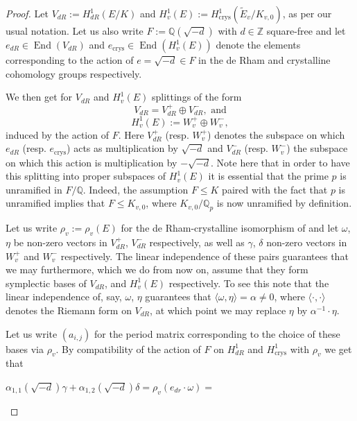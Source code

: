 \documentclass[12pt,twoside,a4paper]{article}
\theoremstyle{plain}%
\DeclareMathOperator{\End}{End}
\DeclareMathOperator{\crys}{crys}
\newcommand{\Z}{\mathbb{Z}}
\newcommand{\Q}{\mathbb{Q}}
\begin{document}
\begin{proof}Let $V_{dR}:=H^1_{dR}(E/K)$ and $H^1_v(E):=H^1_{\crys}(\tilde{E}_v/K_{v,0})$, as per our usual notation. Let us also write $F:=\Q(\sqrt{-d})$ with $d\in \Z$ square-free and let $e_{dR}\in \End(V_{dR})$ and $e_{\crys}\in \End(H^1_v(E))$ denote the elements corresponding to the action of $e=\sqrt{-d}\in F$ in the de Rham and crystalline cohomology groups respectively.
	
	We then get for $V_{dR}$ and $H^1_v(E)$ splittings of the form \begin{equation}\label{eq:splitdr}
		V_{dR}=V^{+}_{dR}\oplus V^{-}_{dR}, \text{ and}
	\end{equation}
	\begin{equation}\label{eq:splitstar}
		H^1_v(E):= W^{+}_v\oplus W^{-}_v,
	\end{equation}induced by the action of $F$. Here $V_{dR}^{+}$ (resp. $W^{+}_v$) denotes the subspace on which $e_{dR}$ (resp. $e_{\crys}$) acts as multiplication by $\sqrt{-d}$ and $V_{dR}^{-}$ (resp. $W^{-}_v$) the subspace on which this action is multiplication by $-\sqrt{-d}$. Note here that in order to have this splitting into proper subspaces of $H^1_v(E)$ it is essential that the prime $p$ is unramified in $F/\Q$. Indeed, the assumption $F\leq K$ paired with the fact that $p$ is unramified implies that $F\leq K_{v,0}$, where $K_{v,0}/\Q_p$ is now unramified by definition.	
	
	Let us write $\rho_v:=\rho_v(E)$ for the de Rham-crystalline isomorphism of \cite{bertogus} and let $\omega$, $\eta$ be non-zero vectors in $V^{+}_{dR}$, $V^{-}_{dR}$ respectively, as well as $\gamma$, $\delta$ non-zero vectors in $W^{+}_v$ and $W^{-}_{v}$ respectively. The linear independence of these pairs guarantees that we may furthermore, which we do from now on, assume that they form symplectic bases of $V_{dR}$, and $H^1_v(E)$ respectively. To see this note that the linear independence of, say, $\omega$, $\eta$ guarantees that $\langle\omega,\eta\rangle=\alpha\neq0$, where $\langle\cdot,\cdot\rangle$ denotes the Riemann form on $V_{dR}$, at which point we may replace $\eta$ by $\alpha^{-1}\cdot \eta$.
	
	Let us write $(a_{i,j})$ for the period matrix corresponding to the choice of these bases via $\rho_v$. By compatibility of the action of $F$ on $H^1_{dR}$ and $H^1_{\crys}$ with $\rho_v$ we get that \begin{center}
		$\alpha_{1,1}(\sqrt{-d})\gamma+\alpha_{1,2}(\sqrt{-d})\delta=\rho_v(e_{dr}\cdot \omega )=$
		

\end{center}
\end{proof}
\end{document}
